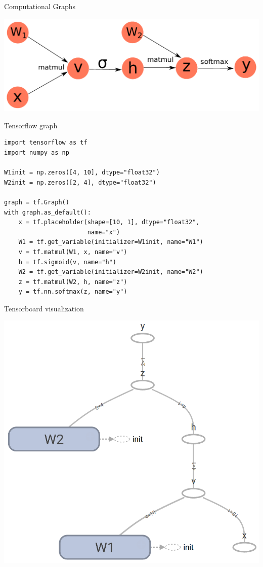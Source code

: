 \documentclass[10pt]{beamer}
\begin{document}
\begin{frame}[fragile]{Computational Graphs}
\begin{center}
\includegraphics[scale=0.62]{images/CompGraph2.pdf}
\end{center}
\end{frame}



\begin{frame}[fragile]{Tensorflow graph}
\begin{verbatim}
import tensorflow as tf
import numpy as np

W1init = np.zeros([4, 10], dtype="float32")
W2init = np.zeros([2, 4], dtype="float32")

graph = tf.Graph() 
with graph.as_default():
    x = tf.placeholder(shape=[10, 1], dtype="float32",
                       name="x") 
    W1 = tf.get_variable(initializer=W1init, name="W1")
    v = tf.matmul(W1, x, name="v")
    h = tf.sigmoid(v, name="h")
    W2 = tf.get_variable(initializer=W2init, name="W2")
    z = tf.matmul(W2, h, name="z")
    y = tf.nn.softmax(z, name="y")
\end{verbatim}
\end{frame}

\begin{frame}[fragile]{Tensorboard visualization}
\begin{center}
\includegraphics[scale=0.255]{images/basic_tf_graph.png}
\end{center}
\end{frame}
\end{document}

